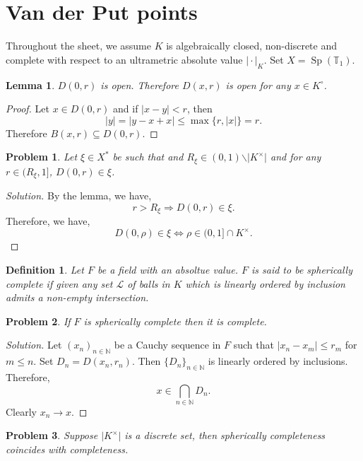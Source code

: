 \documentclass[8pt]{article}
\numberwithin{equation}{section}
\newenvironment{solution}{\begin{proof}[Solution]}{\end{proof}}
\newtheorem{definition}{Definition}[section]
\newtheorem{lemma}{Lemma}[section]
\newtheorem{problem}{Problem}[section]
\DeclareMathOperator{\Sp}{Sp}
\newcommand{\N}[0]{\mathbb{N}}
\newcommand{\T}[0]{\mathbb{T}}
\newcommand{\ab}[1]{\vert #1 \vert}
\begin{document}
\section{Van der Put points}
Throughout the sheet, we assume $K$ is algebraically closed, non-discrete and complete with respect to an ultrametric absolute value $\ab{\cdot}_K$. Set $X=\Sp(\T_1)$.
\begin{lemma}
  $D(0,r)$ is open. Therefore $D(x,r)$ is open for any $x\in K^\circ$.
\end{lemma}
\begin{proof}
  Let $x\in D(0,r)$ and if $\ab{x-y}<r$, then
  \begin{equation*}
    \ab{y} = \ab{y-x+x} \leq \max\{r,\ab{x}\} = r.
  \end{equation*}
  Therefore $B(x,r)\subseteq D(0,r)$.
\end{proof}
\begin{problem}
  Let $\xi\in X^*$ be such that and $R_\xi\in(0,1)\backslash\ab{K^\times}$ and for any $r\in (R_\xi,1]$, $D(0,r)\in\xi$.
\end{problem}
\begin{solution}
  By the lemma, we have,
  \begin{equation*}
    r>R_\xi\Rightarrow D(0,r)\in\xi.
  \end{equation*}
  Therefore, we have,
  \begin{equation*}
    D(0,\rho)\in \xi\iff \rho\in(0,1]\cap K^\times.
  \end{equation*}
\end{solution}
\begin{definition}
  Let $F$ be a field with an absoltue value. $F$ is said to be spherically complete if given any set $\mathcal{L}$ of balls in $K$ which is linearly ordered by inclusion admits a non-empty intersection.
\end{definition}
\begin{problem}
  If $F$ is spherically complete then it is complete.
\end{problem}
\begin{solution}
  Let $(x_n)_{n\in\N}$ be a Cauchy sequence in $F$ such that $\ab{x_n-x_m}\leq r_m$ for $m\leq n$. Set $D_n = D(x_n,r_n)$. Then $\{D_n\}_{n\in\N}$ is linearly ordered by inclusions. Therefore,
  \begin{equation*}
    x\in\bigcap_{n\in\N}D_n.
  \end{equation*}
  Clearly $x_n\to x$.
\end{solution}
\begin{problem}
  Suppose $\ab{K^\times}$ is a discrete set, then spherically completeness coincides with completeness.
\end{problem}
\end{document}
